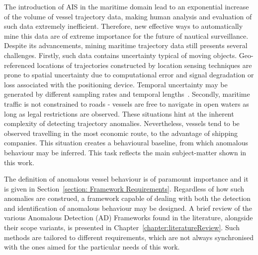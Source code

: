 The introduction of AIS in the maritime domain lead to an exponential increase of the volume of vessel trajectory data, making human analysis and evaluation of such data extremely inefficient. Therefore, new effective ways to automatically mine this data are of extreme importance for the future of nautical surveillance. Despite its advancements, mining maritime trajectory data still presents several challenges. Firstly, such data contains uncertainty typical of moving objects. Geo-referenced locations of trajectories constructed by location sensing techniques are prone to spatial uncertainty due to computational error and signal degradation or loss associated with the positioning device. Temporal uncertainty may be generated by different sampling rates and temporal lengths~\cite{Lee}. 
Secondly, maritime traffic is not constrained to roads - vessels are free to navigate in open waters as long as legal restrictions are observed. These situations hint at the inherent complexity of detecting trajectory anomalies.
Nevertheless, vessels tend to be observed travelling in the most economic route, to the advantage of shipping companies. This situation creates a behavioural baseline, from which anomalous behaviour may be inferred. This task reflects the main subject-matter shown in this work.

The definition of anomalous vessel behaviour is of paramount importance and it is given in Section~\ref{section: Framework Requirements}. Regardless of how such anomalies are construed, a framework capable of dealing with both the detection and identification of anomalous behaviour may be designed. A brief review of the various Anomalous Detection (AD) Frameworks found in the literature, alongside their scope variants, is presented in Chapter~\ref{chapter:literatureReview}. Such methods are tailored to different requirements, which are not always synchronised with the ones aimed for the particular needs of this work.

